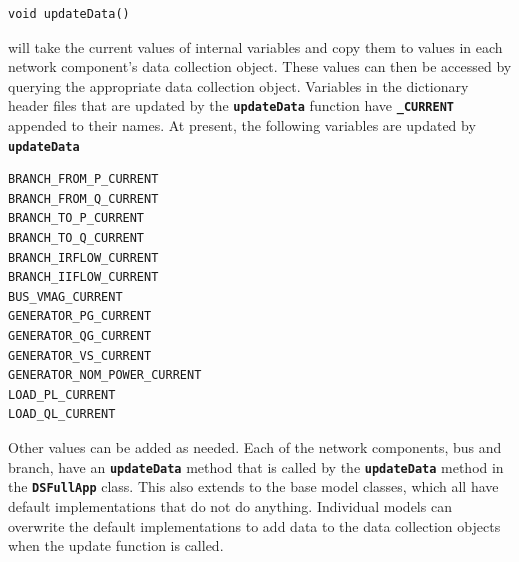 {
\color{red}
\begin{Verbatim}[fontseries=b]
void updateData()
\end{Verbatim}
}

will take the current values of internal variables and copy them to values in
each network component's data collection object. These values can then be
accessed by querying the appropriate data collection object. Variables in the
dictionary header files that are updated by the \texttt{\textbf{updateData}}
function have \texttt{\textbf{\_CURRENT}} appended to their names. At present,
the following variables are updated by \texttt{\textbf{updateData}}

{
\color{red}
\begin{Verbatim}[fontseries=b]
BRANCH_FROM_P_CURRENT
BRANCH_FROM_Q_CURRENT
BRANCH_TO_P_CURRENT
BRANCH_TO_Q_CURRENT
BRANCH_IRFLOW_CURRENT
BRANCH_IIFLOW_CURRENT
BUS_VMAG_CURRENT
GENERATOR_PG_CURRENT
GENERATOR_QG_CURRENT
GENERATOR_VS_CURRENT
GENERATOR_NOM_POWER_CURRENT
LOAD_PL_CURRENT
LOAD_QL_CURRENT
\end{Verbatim}
}

Other values can be added as needed. Each of the network components, bus and
branch, have an \texttt{\textbf{updateData}} method that is called by the
\texttt{\textbf{updateData}} method in the \texttt{\textbf{DSFullApp}} class. This
also extends to the base model classes, which all have default implementations
that do not do anything. Individual models can overwrite the default
implementations to add data to the data collection objects when the update
function is called.
\newline
\hyperlink{topDoc}{\color{blue}{Top}}
